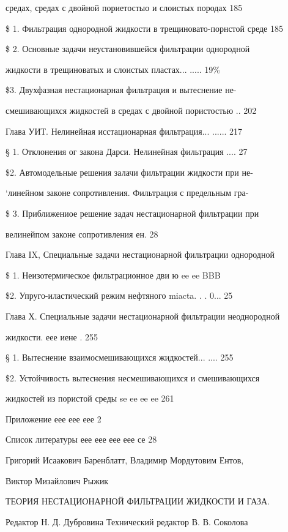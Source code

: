 \documentclass[
  11pt,
]{article}
\begin{document}
средах, средах с двойной пориетостыо и слоистых породах 185\par
\smallskip
\$ 1. Фильтрация однородной жидкости в трещиновато-порнстой среде 185\par
\$ 2. Основные задачи неустановившейся фильтрации однородной\par
\smallskip
жидкости в трещиноватых и слоистых пластах... ..... 19\%\par
\smallskip
\$3. Двухфазная нестационарная фильтрация и вытеснение не-\par
смешивающихся жидкостей в средах с двойной пористостью .. 202\par
Глава УИТ. Нелинейная исстационарная фильтрация... ...... 217\par
\smallskip
§ 1. Отклонения ог закона Дарси. Нелинейная фильтрация .... 27\par
\$2. Автомодельные решения залачи фильтрации жидкости при не-\par
`линейном законе сопротивления. Фильтрация с предельным гра-\par
\smallskip
\$ 3. Приближениое решение задач нестационарной фильтрации при\par
велинейпом законе сопротивления ен. 28\par
\smallskip
Глава IX, Специальные задачи нестационарной фильтрации однородной\par
\$ 1. Неизотермическое фильтрационное дви ю ee ee BBB\par
\$2. Упруго-иластический режим нефтяного miacta. . . 0... 25\par
\smallskip
Глава Х. Специальные задачи нестационарной фильтрации неоднородной\par
жидкости. еее иене . 255\par
§ 1. Вытеснение взаимосмешивающихся жидкостей... .... 255\par
\smallskip
\$2. Устойчивость вытеснения несмешивающихся и смешивающихся\par
жидкостей из пористой среды se ee ee ee 261\par
Приложение еее еее еее 2\par
Список литературы еее еее еее еее се 28\par
\smallskip
Григорий Исаакович Баренблатт, Владимир Мордутовим Ентов,\par
Виктор Мизайлович Рыжик\par
\smallskip
ТЕОРИЯ НЕСТАЦИОНАРНОЙ ФИЛЬТРАЦИИ ЖИДКОСТИ И ГАЗА.\par
\smallskip
Редактор Н. Д. Дубровина Технический редактор В. В. Соколова\par
\end{document}
